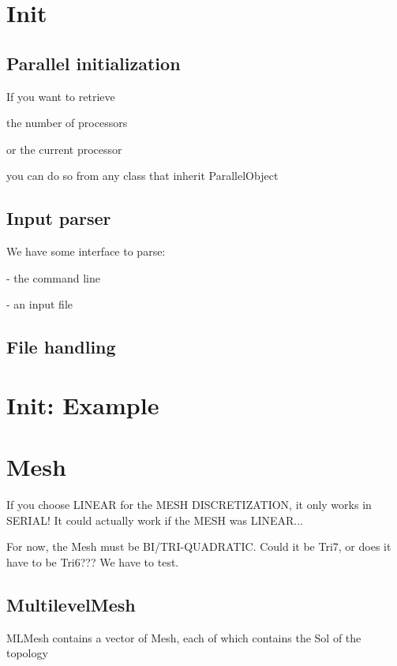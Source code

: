 \documentclass[10pt]{book}
\begin{document}
   
 \chapter{Init}

   \section{Parallel initialization}
   
   If you want to retrieve 
   
   the number of processors
   
   or the current processor
   
   you can do so from any class that inherit ParallelObject
   
   
   
   \section{Input parser}
   
   We have some interface to parse:
   
   - the command line
   
   - an input file
   
   
    \section{File handling}

  \chapter{Init: Example}

 
 \chapter{ Mesh}

    
 If you choose LINEAR for the MESH DISCRETIZATION, it only works in SERIAL! It could actually work if the MESH was LINEAR...
 
 For now, the Mesh must be BI/TRI-QUADRATIC. Could it be Tri7, or does it have to be Tri6??? We have to test.
 
 
   
     \section{MultilevelMesh}
   
   

     MLMesh  contains a vector of Mesh, each of which contains the Sol of the topology
\end{document}
